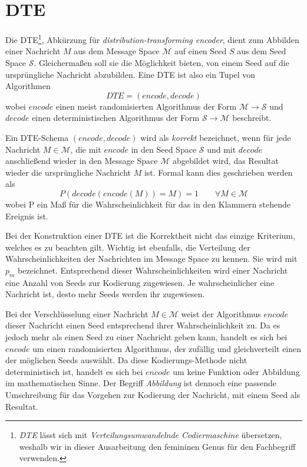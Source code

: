 \section{DTE}
\label{sec:dte}
Die DTE\footnote{\emph{DTE} lässt sich mit \emph{Verteilungsumwandelnde Codiermaschine} übersetzen, weshalb wir in dieser Ausarbeitung den femininen Genus für den Fachbegriff verwenden.}, Abkürzung für \emph{distribution-transforming encoder}, dient zum Abbilden einer Nachricht $M$ aus dem Message Space $\mathcal{M}$ auf einen Seed $S$ aus dem Seed Space $\mathcal{S}$. Gleichermaßen soll sie die Möglichkeit bieten, von einem Seed auf die ursprüngliche Nachricht abzubilden. Eine DTE ist also ein Tupel von Algorithmen
$$DTE = (encode, decode)$$
wobei $encode$ einen meist randomisierten Algorithmus der Form $\mathcal{M} \rightarrow \mathcal{S}$ und $decode$ einen deterministischen Algorithmus der Form $\mathcal{S} \rightarrow \mathcal{M}$ beschreibt.

Ein DTE-Schema $(encode, decode)$ wird als \emph{korrekt} bezeichnet, wenn für jede Nachricht $M \in \mathcal{M}$, die mit $encode$ in den Seed Space $\mathcal{S}$ und mit $decode$ anschließend wieder in den Message Space $\mathcal{M}$ abgebildet wird, das Resultat wieder die ursprüngliche Nachricht $M$  ist. Formal kann dies geschrieben werden als
$$P(decode(encode(M)) = M) = 1 \qquad \forall M \in \mathcal{M}$$
wobei P ein Maß für die Wahrscheinlichkeit für das in den Klammern stehende Ereignis ist.

Bei der Konstruktion einer DTE ist die Korrektheit nicht das einzige Kriterium, welches es zu beachten gilt. Wichtig ist ebenfalls, die Verteilung der Wahrscheinlichkeiten der Nachrichten im Message Space zu kennen. Sie wird mit $p_m$ bezeichnet. Entsprechend dieser Wahrscheinlichkeiten wird einer Nachricht eine Anzahl von Seeds zur Kodierung zugewiesen. Je wahrscheinlicher eine Nachricht ist, desto mehr Seeds werden ihr zugewiesen.

Bei der Verschlüsselung einer Nachricht $M \in \mathcal{M}$ weist der Algorithmus $encode$ dieser Nachricht einen Seed entsprechend ihrer Wahrscheinlichkeit zu. Da es jedoch mehr als einen Seed zu einer Nachricht geben kann, handelt es sich bei $encode$ um einen randomisierten Algorithmus, der zufällig und gleichverteilt einen der möglichen Seeds auswählt. Da diese Kodierungs-Methode nicht deterministisch ist, handelt es sich bei $encode$ um keine Funktion oder Abbildung im mathematischen Sinne. Der Begriff \emph{Abbildung} ist dennoch eine passende Umschreibung für das Vorgehen zur Kodierung der Nachricht, mit einem Seed als Resultat.

